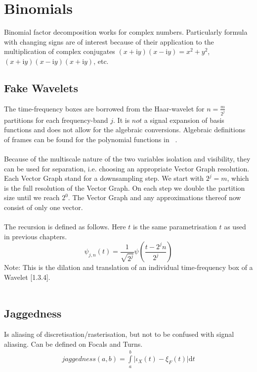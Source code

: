\documentclass{report}
\begin{document}
\section{Binomials}
Binomial factor decomposition works for complex numbers. Particularly formula with changing signs are of interest because of their application to the multiplication of complex conjugates $(x+\mathrm{i}y)(x-\mathrm{i}y)=x^2+y^2$, $(x+\mathrm{i}y)(x-\mathrm{i}y)(x+\mathrm{i}y)$, etc.

\subsection{Fake Wavelets}
The time-frequency boxes are borrowed from the Haar-wavelet for $n=\frac{m}{2^j}$ partitions for each frequency-band $j$. It is $not$ a signal expansion of basis functions and does not allow for the algebraic conversions. Algebraic definitions of frames can be found for the polynomial functions in ~\cite[Spline\_Axioms.tex]{Axioms}.\\\\
Because of the multiscale nature of the two variables isolation and visibility, they can be used for separation, i.e. choosing an appropriate Vector Graph resolution. Each Vector Graph stand for a downsampling step. We start with $2^j=m$, which is the full resolution of the Vector Graph. On each step we double the partition size until we reach $2^0$. The Vector Graph and any approximations thereof now consist of only one vector.\\\\
The recursion is defined as follows. Here $t$ is the same parametrisation $t$ as used in previous chapters.
\begin{equation}
\psi_{j,n}(t)=\frac{1}{\sqrt{2^j}}\psi(\frac{t-2^j n}{2^j})
\end{equation}
Note: This is the dilation and translation of an individual time-frequency box of a Wavelet \cite{Mallat}[1.3.4].\\\\

\subsection{Jaggedness}
Is aliasing of discretisation/rasterisation, but not to be confused with signal aliasing. Can be defined on Focals and Turns.
\begin{align}
jaggedness(a,b)=\int \limits _{a}^{b} \lvert \iota_{X}(t)-\xi_{F}(t)\rvert \mathrm{d}t
\end{align}
\end{document}
